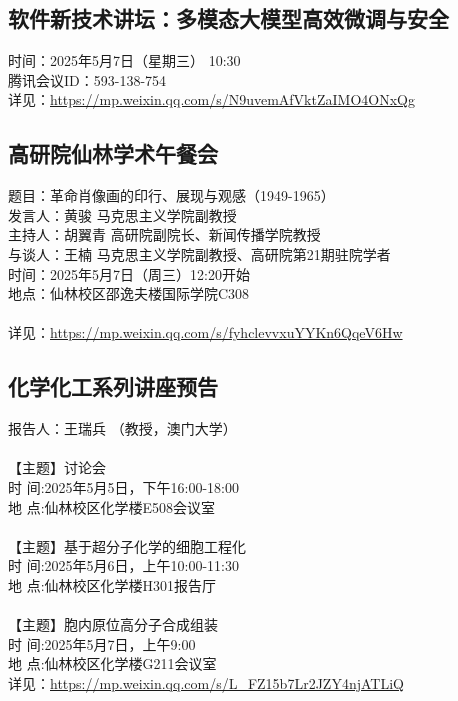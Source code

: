 \documentclass[letterpaper, 12pt]{article}
\begin{document}
\begin{multicols}{2}
\subsection{软件新技术讲坛：多模态大模型高效微调与安全} %
时间：2025年5月7日（星期三） 10:30
\\腾讯会议ID：593-138-754
\\详见：\url{https://mp.weixin.qq.com/s/N9uvemAfVktZaIMO4ONxQg}
\subsection{高研院仙林学术午餐会} %
题目：革命肖像画的印行、展现与观感（1949-1965）
\\发言人：黄骏 马克思主义学院副教授
\\主持人：胡翼青 高研院副院长、新闻传播学院教授
\\与谈人：王楠 马克思主义学院副教授、高研院第21期驻院学者
\\时间：2025年5月7日（周三）12:20开始
\\地点：仙林校区邵逸夫楼国际学院C308
\\
\\详见：\url{https://mp.weixin.qq.com/s/fyhclevvxuYYKn6QqeV6Hw}
\subsection{化学化工系列讲座预告} %
报告人：王瑞兵 （教授，澳门大学）
\\
\\【主题】讨论会
\\时 间:2025年5月5日，下午16:00-18:00
\\地 点:仙林校区化学楼E508会议室
\\
\\【主题】基于超分子化学的细胞工程化
\\时 间:2025年5月6日，上午10:00-11:30
\\地 点:仙林校区化学楼H301报告厅
\\
\\【主题】胞内原位高分子合成组装
\\时 间:2025年5月7日，上午9:00
\\地 点:仙林校区化学楼G211会议室
\\详见：\url{https://mp.weixin.qq.com/s/L_FZ15b7Lr2JZY4njATLiQ}

\end{multicols}
\end{document}

